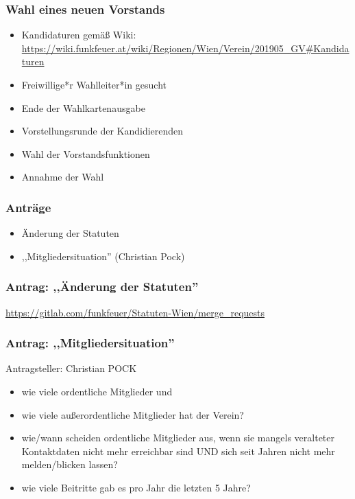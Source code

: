 \documentclass[17pt]{beamer} %
\begin{document}
\begin{frame}
	\frametitle{Wahl eines neuen Vorstands}
	\begin{itemize}
		\item Kandidaturen gemäß Wiki: \url{https://wiki.funkfeuer.at/wiki/Regionen/Wien/Verein/201905_GV\#Kandidaturen}
		\item Freiwillige*r Wahlleiter*in gesucht
		\item Ende der Wahlkartenausgabe
		\item Vorstellungsrunde der Kandidierenden
		\item Wahl der Vorstandsfunktionen
		\item Annahme der Wahl
	\end{itemize}
\end{frame}



\begin{frame}
	\frametitle{Anträge}
	\begin{itemize}
		\item Änderung der Statuten
		\item ,,Mitgliedersituation'' (Christian Pock)
	\end{itemize}
\end{frame}



\begin{frame}
	\frametitle{Antrag: ,,Änderung der Statuten''}
	\url{https://gitlab.com/funkfeuer/Statuten-Wien/merge_requests}
\end{frame}



\begin{frame}
	\frametitle{Antrag: ,,Mitgliedersituation''}
	Antragsteller: Christian POCK
	\small{
	\begin{itemize}
		\item wie viele ordentliche Mitglieder und
		\item wie viele außerordentliche Mitglieder hat der Verein?
		\item wie/wann scheiden ordentliche Mitglieder aus, wenn sie mangels veralteter Kontaktdaten nicht mehr erreichbar sind UND sich seit Jahren nicht mehr melden/blicken lassen?
		\item wie viele Beitritte gab es pro Jahr die letzten 5 Jahre?
	\end{itemize}
	}
\end{frame}
\end{document}

